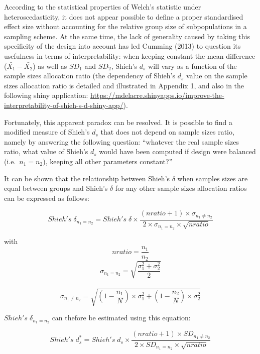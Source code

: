 \documentclass[
  man,floatsintext]{apa6}
\begin{document}
According to the statistical properties of Welch's statistic under heteroscedasticity, it does not appear possible to define a proper standardised effect size without accounting for the relative group size of subpopulations in a sampling scheme. At the same time, the lack of generality caused by taking this specificity of the design into account has led Cumming (2013) to question its usefulness in terms of interpretability: when keeping constant the mean difference (\(\bar{X_1}-\bar{X_2}\)) as well as \(SD_1\) and \(SD_2\), Shieh's \(d_s\) will vary as a function of the sample sizes allocation ratio (the dependency of Shieh's \(d_s\) value on the sample sizes allocation ratio is detailed and illustrated in Appendix 1, and also in the following shiny application: \url{https://mdelacre.shinyapps.io/improve-the-interpretability-of-shieh-s-d-shiny-app/}).

Fortunately, this apparent paradox can be resolved. It is possible to find a modified measure of Shieh's \(d_s\) that does not depend on sample sizes ratio, namely by answering the following question: \enquote{whatever the real sample sizes ratio, what value of Shieh's \(d_s\) would have been computed if design were balanced (i.e.~\(n_1 = n_2\)), keeping all other parameters constant?}

It can be shown that the relationship between Shieh's \(\delta\) when samples sizes are equal between groups and Shieh's \(\delta\) for any other sample sizes allocation ratios can be expressed as follows:

\begin{equation} 
Shieh's \; \delta_{n_1=n_2}= Shieh's \; \delta \times \frac{(nratio+1) \times \sigma_{n_1 \neq n_2}}{2 \times \sigma_{n_1=n_2} \times \sqrt{nratio}}
\label{eq:shiehvsbaldesignPOP}
\end{equation}

with \[nratio= \frac{n_1}{n_2}\]
\[\sigma_{n_1=n_2}= \sqrt{\frac{\sigma_1^2+\sigma_2^2}{2}}\]\\
\[\sigma_{n_1 \neq n_2} = \sqrt{(1- \frac{n_1}{N}) \times \sigma_1^2+(1- \frac{n_2}{N}) \times \sigma_2^2}\]

\(Shieh's \; \delta_{n_1=n_2}\) can thefore be estimated using this equation:

\begin{equation} 
Shieh's \; d^*_s= Shieh's \; d_s \times \frac{(nratio+1) \times SD_{n_1 \neq n_2}}{2 \times SD_{n_1=n_2} \times \sqrt{nratio}}
\label{eq:shiehvsbaldesign}
\end{equation}
\end{document}
